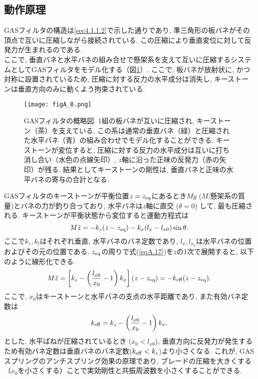 \subsection{動作原理}
GASフィルタの構造は\ref{sec4.1.1.2}で示した通りであり, 準三角形の板バネがその頂点で互いに圧縮しながら接続されている. この圧縮により垂直変位に対して反発力が生まれるのである. \\
\quad ここで, 垂直バネと水平バネの組み合せで懸架系を支えて互いに圧縮するシステムとしてGASフィルタをモデル化する（図\ref{figA.8}）. ここで, 板バネが放射状に, かつ対称に設置されているため, 圧縮に対する反力の水平成分は消失し, キーストーンは垂直方向のみに動くよう拘束されている. 
\begin{figure}[H]
\begin{center}
\texttt{[image: figA\_8.png]} 
\caption[GASフィルタの概略図]{GASフィルタの概略図. 1組の板バネが互いに圧縮され, キーストーン（茶）を支えている. この系は通常の垂直バネ（緑）と圧縮された水平バネ（青）の組み合わせでモデル化することができる. キーストーンが変位すると, 圧縮に対する反力の水平成分は互いに打ち消し合い（水色の点線矢印）, $z$軸に沿った正味の反発力（赤の矢印）が残る. 結果としてキーストーンの剛性は, 垂直バネと正味の水平バネの寄与の合計となる. }
\label{figA.8}
\end{center}
\end{figure}
GASフィルタのキーストーンが平衡位置$z=z_{\rm eq}$にあるとき$Mg$ ($M$:懸架系の質量)とバネの力が釣り合っており, 水平バネは$z$軸に直交 ($\theta=0$) して, 最も圧縮される. キーストーンが平衡状態から変位すると運動方程式は
\begin{equation}
M\ddot{z}=-k_z(z-z_{\rm eq})-k_x(l_x-l_{x0})\sin\theta.
\label{eqA.17}
\end{equation}
ここで$k_z, k_l$はそれぞれ垂直, 水平バネのバネ定数であり, $l_x, l_{x_0}$は水平バネの位置およびその元の位置である. $z_{\rm eq}$の周りで式(\ref{eqA.17})を$z$の1次で展開すると, 以下のように線形化できる. 
\begin{equation}
M\ddot{z}=\left[k_z-\left(\frac{l_{x0}}{x_0}-1\right)k_x\right](z-z_{\rm eq})=-k_{\rm eff}(z-z_{\rm eq}).
\end{equation}
ここで, $x_0$はキーストーンと水平バネの支点の水平距離であり, また有効バネ定数は
\begin{equation}
k_{\rm eff}=k_z-\left(\frac{l_{x0}}{x_0}-1\right)k_x,
\end{equation}
とした. 水平ばねが圧縮されているとき ($x_0<l_{x0}$), 垂直方向に反発力が発生するため有効バネ定数は垂直バネのバネ定数($k_{\rm eff}<k_z$)より小さくなる. これが, GASスプリングのアンチスプリング効果の原理であり, ブレードの圧縮を大きくする（$x_0$を小さくする）ことで実効剛性と共振周波数を小さくすることができる. 
